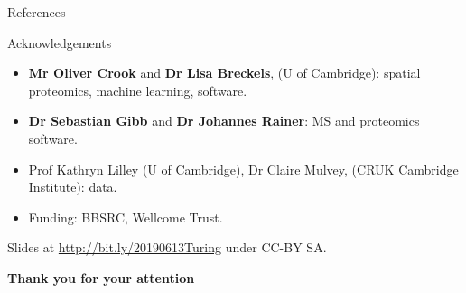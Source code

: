 \documentclass[presentation]{beamer}
\begin{document}
\begin{frame}[allowframebreaks]{References}
  \scriptsize
  
  
\end{frame}


\begin{frame}
  \begin{block}{Acknowledgements}
    \begin{itemize}
    \item \textbf{Mr Oliver Crook} and \textbf{Dr Lisa Breckels}, (U
      of Cambridge): spatial proteomics, machine learning, software.
    \item \textbf{Dr Sebastian Gibb} and \textbf{Dr Johannes Rainer}:
      MS and proteomics software.
    \item Prof Kathryn Lilley (U of Cambridge), Dr Claire Mulvey,
      (CRUK Cambridge Institute): data.
    \item Funding: BBSRC, Wellcome Trust.
    \end{itemize}

    Slides at \url{http://bit.ly/20190613Turing} under CC-BY SA.
 
  \end{block}

  
  \begin{center}
    \textbf{Thank you for your attention}
  \end{center}

\end{frame}
\end{document}
